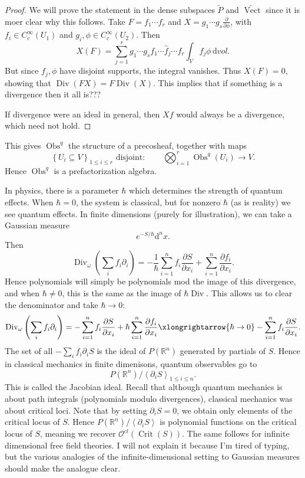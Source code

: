\begin{proof}
	We will prove the statement in the dense subspaces $\widetilde{P} $ and $\widetilde{\operatorname{Vect} } $ since it is moer clear why this follows. Take $F=f_1 \cdots f_r$ and $X=g_1 \cdots g_s \frac{\partial }{\partial \phi } $, with $f_i\in C_c^\infty (U_1)$ and $g_i,\phi \in C^\infty _c(U_2)$. Then
	\[
		X(F)=\sum_{j=1}^{r} g_1 \cdots g_s f_1 \cdots \widehat{f} _j \cdots f_r \int_Vf_j\phi \,\mathrm{d} vol
	.\]
	But since $f_j,\phi $ have disjoint supports, the integral vanishes. Thus $X(F)=0$, showing that $\operatorname{Div} (FX)=F \operatorname{Div} (X)$. This implies that if something is a divergence then it all is???

	If divergence were an ideal in general, then $Xf$ would always be a divergence, which need not hold.
\end{proof}

This gives $\operatorname{Obs} ^q$ the structure of a precosheaf, together with maps
\[
	\left\{ U_i\subseteq V \right\} _{1\leq i\leq r} \text{ disjoint}:\qquad \bigotimes_{i=1}^r \operatorname{Obs} ^q(U_i)\to V
.\]
Hence $\operatorname{Obs} ^q$ is a prefactorization algebra.

In physics, there is a parameter $\hbar $ which determines the strength of quantum effects. When $\hbar =0$, the system is classical, but for nonzero $\hbar $ (as is reality) we see quantum effects. In finite dimensions (purely for illustration), we can take a Gaussian measure
\[
	e^{-S/\hbar } \mathrm{d} ^nx
.\]
Then
\[
	\operatorname{Div} _\omega \left(\sum_{i} f_i \partial _i\right)=-\frac{1}{\hbar } \sum_{i=1} ^n f_i \frac{\partial S}{\partial x_i} + \sum_{i=1}^{n} \frac{\partial f_i}{\partial x_i} 
.\]
Hence polynomials will simply be polynomials mod the image of this divergence, and when $\hbar \neq 0$, this is the same as the image of $\hbar \operatorname{Div} $. This allows us to clear the denominator and take $\hbar \to 0$:
\[
	\operatorname{Div} _\omega \left( \sum_{i} f_i \partial _i \right) =-\sum_{i=1}^{n} f_i \frac{\partial S}{\partial x_i} +\hbar \sum_{i=1}^{n} \frac{\partial f_i}{\partial x_i} \xlongrightarrow{\hbar \to 0} -\sum_{i=1}^{n} f_i \frac{\partial S}{\partial x_i} 
.\]
The set of all $-\sum_{i}f_i \partial_iS$ is the ideal of $P(\mathbb{R} ^n)$ generated by partials of $S$. Hence in classical mechanics in finite dimenisons, quantum observables go to
\[
	P(\mathbb{R} ^n) / \left\langle \partial _iS \right\rangle_{1\leq i\leq n} 
.\]
This is called the Jacobian ideal. Recall that although quantum mechanics is about path integrals (polynomials modulo divergences), classical mechanics was about critical loci. Note that by setting $\partial _iS=0$, we obtain only elements of the critical locus of $S$. Hence $P(\mathbb{R} ^n) / \left\langle \partial _iS \right\rangle $ is polynomial functions on the critical locus of $S$, meaning we recover $\mathcal{O} ^{cl} (\operatorname{Crit} (S))$. The same follows for infinite dimensional free field theories. I will not explain it because I'm tired of typing, but the various analogies of the infinite-dimensional setting to Gaussian measures should make the analogue clear.

